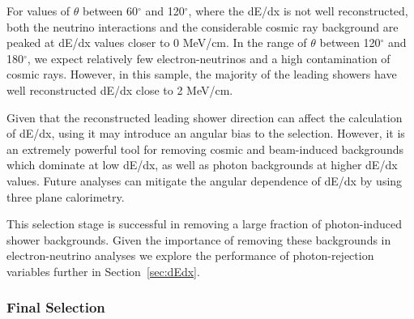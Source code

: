 For values of $\theta$ between 60$^{\circ}$ and 120$^{\circ}$, where the dE/dx is not well reconstructed, both the neutrino interactions and the considerable cosmic ray background are peaked at dE/dx values closer to 0 MeV/cm. In the range of $\theta$ between 120$^{\circ}$ and 180$^{\circ}$, we expect relatively few electron-neutrinos and a high contamination of cosmic rays. However, in this sample, the majority of the leading showers have well reconstructed dE/dx close to 2 MeV/cm.

Given that the reconstructed leading shower direction can affect the calculation of dE/dx, using it may introduce an angular bias to the selection. %
However, it is an extremely powerful tool for removing cosmic and beam-induced backgrounds which dominate at low dE/dx, as well as photon backgrounds at higher dE/dx values. Future analyses can mitigate the angular dependence of dE/dx by using three plane calorimetry.

This selection stage is successful in removing a large fraction of photon-induced shower backgrounds. Given the importance of removing these backgrounds in electron-neutrino analyses we explore the performance of photon-rejection variables further in Section~\ref{sec:dEdx}.




\subsubsection{Final Selection}




